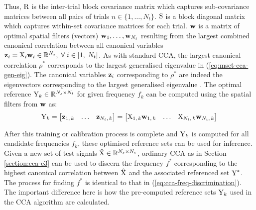 Thus, ${\textrm{R}}$ is the inter-trial block covariance matrix which captures sub-covariance matrices between all pairs of trials $n\in \{1, \dots, N_t \}$. ${\textrm{S}}$ is a block diagonal matrix which captures within-set covariance matrices for each trial. ${\mathbf{w}}$ is a matrix of optimal spatial filters (vectors) ${\mathbf{w}}_1, \dots, {\mathbf{w}}_{N_t}$ resulting from the largest combined canonical correlation between all canonical variables ${\mathbf{z}}_i = {\textrm{X}}_i{\mathbf{w}}_i \in \mathbb{R}^{N_s}, \; \forall \; i\in[1, \; N_t]$. As with standard CCA, the largest canonical correlation $\rho^*$ corresponds to the largest generalised eigenvalue in (\ref{eq:mset-cca-gen-eig}). The canonical variables ${\mathbf{z}}_i$ corresponding to $\rho^*$ are indeed the eigenvectors corresponding to the largest generalised eigenvalue \cite{zhang-mset-cca}. The optimal reference ${\textrm{Y}}_k \in \mathbb{R}^{N_s \times N_t}$ for given frequency $f_k$ can be computed using the spatial filters from ${\mathbf{w}}$ as:
\begin{align}
    {\textrm{Y}}_k =
    \begin{bmatrix}
    {\mathbf{z}}_{1, \, k} & \dots & {\mathbf{z}}_{N_t, \,k}
    \end{bmatrix}
    =
    \begin{bmatrix}
    {\textrm{X}}_{1, \, k}{\mathbf{w}}_{1, \, k}  & \dots & {\textrm{X}}_{N_t, \,k}{\mathbf{w}}_{N_t,\, k} 
    \end{bmatrix}
\end{align}

After this training or calibration process is complete and ${\textrm{Y}}_k$ is computed for all candidate frequencies $f_k$, these optimised reference sets can be used for inference. Given a new set of test signals $\hat{{\textrm{X}}} \in \mathbb{R}^{N_s \times N_c}$, ordinary CCA as in Section \ref{section:cca-c3} can be used to discern the frequency $f^*$ corresponding to the highest canonical correlation between $\hat{{\textrm{X}}}$ and the associated referenced set ${\textrm{Y}}^*$. The process for finding $f^*$ is identical to that in (\ref{eq:cca-freq-discrimination}). The important difference here is how the pre-computed reference sets ${\textrm{Y}}_k$ used in the CCA algorithm are calculated.


